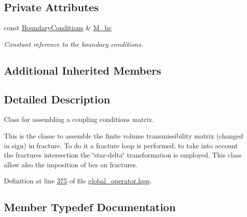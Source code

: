 \subsection*{Private Attributes}
\begin{DoxyCompactItemize}
\item 
const \hyperlink{classFVCode3D_1_1BoundaryConditions}{Boundary\+Conditions} \& \hyperlink{classFVCode3D_1_1FluxOperator_a4b4dd846c5097f14598d9b75e6c2e306}{M\+\_\+bc}
\begin{DoxyCompactList}\small\item\em Constant reference to the boundary conditions. \end{DoxyCompactList}\end{DoxyCompactItemize}
\subsection*{Additional Inherited Members}


\subsection{Detailed Description}
Class for assembling a coupling conditions matrix. 

This is the classe to assemble the finite volume transmissibility matrix (changed in sign) in fracture. To do it a fracture loop is performed; to take into account the fractures intersection the \char`\"{}star-\/delta\char`\"{} transformation is employed. This class allow also the imposition of bcs on fractures. 

Definition at line \hyperlink{global__operator_8hpp_source_l00375}{375} of file \hyperlink{global__operator_8hpp_source}{global\+\_\+operator.\+hpp}.



\subsection{Member Typedef Documentation}
\subsubsection[{\texorpdfstring{Edge\+\_\+\+ID}{Edge_ID}}]{\hspace{0.3cm}{\ttfamily [private]}}\hypertarget{classFVCode3D_1_1FluxOperator_a2c9bcb854de0d6aa308ff7c944a1aa31}{}\label{classFVCode3D_1_1FluxOperator_a2c9bcb854de0d6aa308ff7c944a1aa31}


